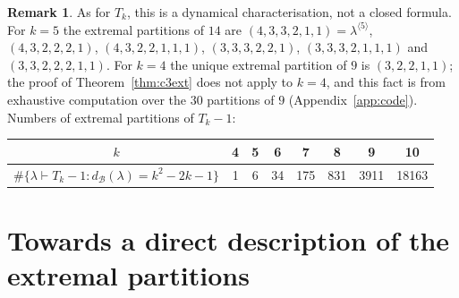 \documentclass[11pt]{article}
\theoremstyle{definition}
\newtheorem{remark}[theorem]{Remark}
\newcommand{\dB}{d_{\mathcal{B}}}
\begin{document}
\begin{remark}
As for $T_k$, this is a dynamical characterisation, not a closed formula.  For $k=5$ the extremal
partitions of $14$ are $(4,3,3,2,1,1)=\lambda^{\langle5\rangle}$, $(4,3,2,2,2,1)$, $(4,3,2,2,1,1,1)$,
$(3,3,3,2,2,1)$, $(3,3,3,2,1,1,1)$ and $(3,3,2,2,2,1,1)$.  For $k=4$ the unique extremal partition of $9$ is
$(3,2,2,1,1)$; the proof of Theorem~\ref{thm:c3ext} does not apply to $k=4$, and this fact is from exhaustive
computation over the $30$ partitions of $9$ (Appendix~\ref{app:code}).  Numbers of extremal partitions of $T_k-1$:
\begin{center}
\begin{tabular}{c|ccccccc}
$k$ & 4 & 5 & 6 & 7 & 8 & 9 & 10\\\hline
$\#\{\lambda\vdash T_k-1:\dB(\lambda)=k^2-2k-1\}$ & 1 & 6 & 34 & 175 & 831 & 3911 & 18163
\end{tabular}
\end{center}
\end{remark}

\section{Towards a direct description of the extremal partitions}\label{sec:c3direct}
\end{document}
